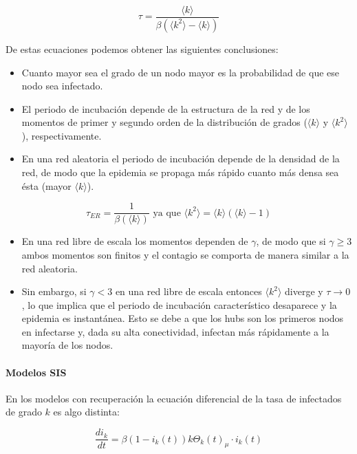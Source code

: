 \documentclass[]{article}
\begin{document}
\[\tau = \frac{\langle k \rangle}{\beta(\langle k^2 \rangle - \langle k \rangle)}\]

De estas ecuaciones podemos obtener las siguientes conclusiones:

\begin{itemize}
\itemsep1pt\parskip0pt
\item
  Cuanto mayor sea el grado de un nodo mayor es la probabilidad de que
  ese nodo sea infectado.
\item
  El periodo de incubación depende de la estructura de la red y de los
  momentos de primer y segundo orden de la distribución de grados
  (\(\langle k \rangle\) y \(\langle k^2 \rangle\)), respectivamente.
\item
  En una red aleatoria el periodo de incubación depende de la densidad
  de la red, de modo que la epidemia se propaga más rápido cuanto más
  densa sea ésta (mayor \(\langle k \rangle\)).
\end{itemize}

\[\tau_{ER} = \frac{1}{\beta(\langle k \rangle)} \text{ ya que } \langle k^2 \rangle = \langle k \rangle (\langle k \rangle - 1)\]

\begin{itemize}
\itemsep1pt\parskip0pt
\item
  En una red libre de escala los momentos dependen de \(\gamma\), de
  modo que si \(\gamma \geq 3\) ambos momentos son finitos y el contagio
  se comporta de manera similar a la red aleatoria.
\item
  Sin embargo, si \(\gamma < 3\) en una red libre de escala entonces
  \(\langle k^2 \rangle\) diverge y \(\tau \to 0\), lo que implica que
  el periodo de incubación característico desaparece y la epidemia es
  instantánea. Esto se debe a que los hubs son los primeros nodos en
  infectarse y, dada su alta conectividad, infectan más rápidamente a la
  mayoría de los nodos.
\end{itemize}

\paragraph*{Modelos SIS}\label{modelos-sis}

En los modelos con recuperación la ecuación diferencial de la tasa de
infectados de grado \(k\) es algo distinta:

\[\frac{di_k}{dt} = \beta (1-i_k(t))k \Theta_k(t) _ \mu \cdot i_k(t)\]
\end{document}
